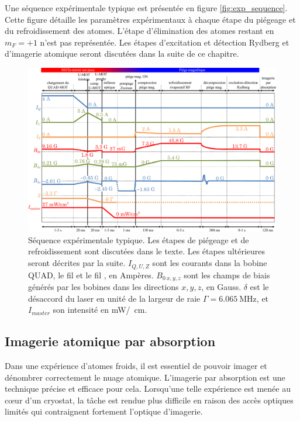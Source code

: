 Une séquence expérimentale typique est présentée en figure \eqref{fig:exp_sequence}.
Cette figure détaille les paramètres expérimentaux à chaque étape du piégeage et du refroidissement des atomes.
L'étape d'élimination des atomes restant en $m_F=+1$ n'est pas représentée.
Les étapes d'excitation et détection Rydberg et d'imagerie atomique seront discutées dans la suite de ce chapitre.

%	
\begin{figure}
\centering
\includegraphics[width=\linewidth]{figures/setup/coldatoms/exp_sequence}
\caption[Séquence expérimentale typique]{Séquence expérimentale typique.%
Les étapes de piégeage et de refroidissement sont %
discutées dans le texte.
Les étapes ultérieures seront décrites par la suite.
$I_{Q,U,Z}$ sont les courants dans la bobine QUAD, le fil  et le fil , en Ampères.
$B_{0~x,y,z}$ sont les champs de biais générés par les bobines dans les directions $x,y,z$, en Gauss.
$\delta$ est le désaccord du laser en unité de la largeur de raie $\Gamma=\SI{6.065}{\MHz}$, et $I_{master}$ son intensité en \si[per-mode=symbol]{\milli\watt \per\squared\cm}.
}
\label{fig:exp_sequence}
\end{figure}

		
	\subsection{Imagerie atomique par absorption}
	
\noindent Dans une expérience d'atomes froids, il est essentiel de pouvoir imager et dénombrer correctement le nuage atomique.
L'imagerie par absorption est une technique précise et efficace pour cela.
Lorsqu'une telle expérience est menée au c\oe ur d'un cryostat, la tâche est rendue plus difficile en raison des accès optiques limités qui contraignent fortement l'optique d'imagerie.

